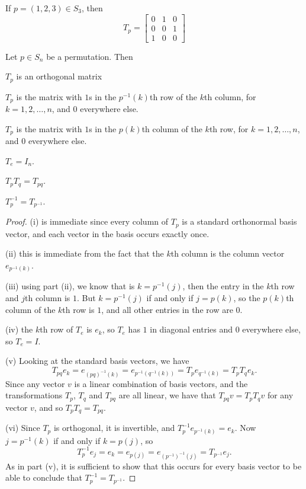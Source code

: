 \begin{example}
  If $p = (1,2,3) \in S_{3}$, then
  \[
    T_{p} = \begin{bmatrix}
      0 & 1 & 0\\
      0 & 0 & 1\\
      1 & 0 & 0
    \end{bmatrix}
  \]
\end{example}

\begin{proposition}
  Let $p \in S_{n}$ be a permutation.  Then
  \begin{theoremenum}
    \item $T_{p}$ is an orthogonal matrix
    \item $T_{p}$ is the matrix with $1$s in the $p^{-1}(k)$th row of the
      $k$th column, for $k = 1,2,\ldots,n$, and $0$ everywhere else.
    \item $T_{p}$ is the matrix with $1$s in the $p(k)$th column of the
      $k$th row, for $k = 1,2,\ldots,n$, and $0$ everywhere else.
    \item $T_{e} = I_{n}$.
    \item $T_{p}T_{q} = T_{pq}$.
    \item $T_{p}^{-1} = T_{p^{-1}}$.
  \end{theoremenum}
\end{proposition}
\begin{proof}
  (i) is immediate since every column of $T_{p}$ is a standard orthonormal
  basis vector, and each vector in the basis occurs exactly once.
  
  (ii) this is immediate from the fact that the $k$th column is the column
  vector $e_{p^{-1}(k)}$.
  
  (iii) using part (ii), we know that is $k = p^{-1}(j)$, then the entry in
  the $k$th row and $j$th column is $1$.  But $k = p^{-1}(j)$ if and only if
  $j = p(k)$, so the $p(k)$th column of the $k$th row is $1$, and all other
  entries in the row are $0$.
  
  (iv) the $k$th row of $T_{e}$ is $e_{k}$, so $T_{e}$ has $1$ in diagonal
  entries and $0$ everywhere else, so $T_{e} = I$.
  
  (v) Looking at the standard basis vectors, we have
  \[
    T_{pq}e_{k} = e_{(pq)^{-1}(k)} = e_{p^{-1}(q^{-1}(k))} =
    T_{p}e_{q^{-1}(k)} = T_{p}T_{q}e_{k}.
  \]
  Since any vector $v$ is a linear combination of basis vectors, and the
  transformations $T_{p}$, $T_{q}$ and $T_{pq}$ are all linear, we have that
  $T_{pq}v = T_{p}T_{q}v$ for any vector $v$, and so $T_{p}T_{q} = T_{pq}$.
  
  (vi) Since $T_{p}$ is orthogonal, it is invertible, and
  $T_{p}^{-1}e_{p^{-1}(k)} = e_{k}$.  Now $j = p^{-1}(k)$ if and only if
  $k = p(j)$, so
  \[
    T_{p}^{-1}e_{j} = e_{k} = e_{p(j)} = e_{(p^{-1})^{-1}(j)} = T_{p^{-1}}e_{j}.
  \]
  As in part (v), it is sufficient to show that this occurs for every basis
  vector to be able to conclude that $T_{p}^{-1} = T_{p^{-1}}$.
\end{proof}

